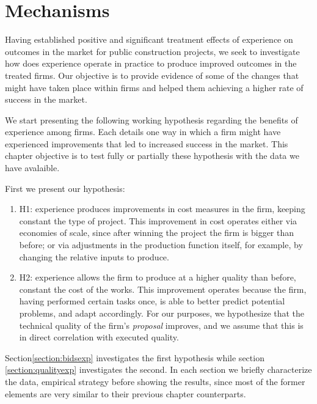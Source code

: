 \chapter{Mechanisms}
Having established positive and significant treatment effects of  experience on outcomes in the market for public construction projects, we seek to investigate how does experience operate in practice to produce improved outcomes in the treated firms. Our objective is to provide evidence of some of the changes that might have taken place within firms and helped them achieving a higher rate of success in the market.

We start presenting the following working hypothesis regarding the benefits of experience among firms. Each details one way in which a firm might have experienced improvements that led to increased success in the market. This chapter objective is to test fully or partially these hypothesis with the data we have avalaible.

First we present our hypothesis:
\begin{enumerate}
  \item{H1}: experience produces improvements in cost measures in the firm, keeping constant the type of project. This improvement in cost operates either via economies of scale, since after winning the project the firm is bigger than before; or via adjustments in the production function itself, for example, by changing the relative inputs to produce.
  \item{H2}: experience allows the firm to produce at a higher quality than before, constant the cost of the works. This improvement operates because the firm, having performed certain tasks once, is able to better predict potential problems, and adapt accordingly. For our purposes, we hypothesize that the technical quality of the firm's \textit{proposal} improves, and we assume that this is in direct correlation with executed quality.
\end{enumerate}

Section\ref{section:bidsexp} investigates the first hypothesis while section \ref{section:qualityexp} investigates the second. In each section we briefly characterize the data, empirical strategy before showing the results, since most of the former elements are very similar to their previous chapter counterparts.



